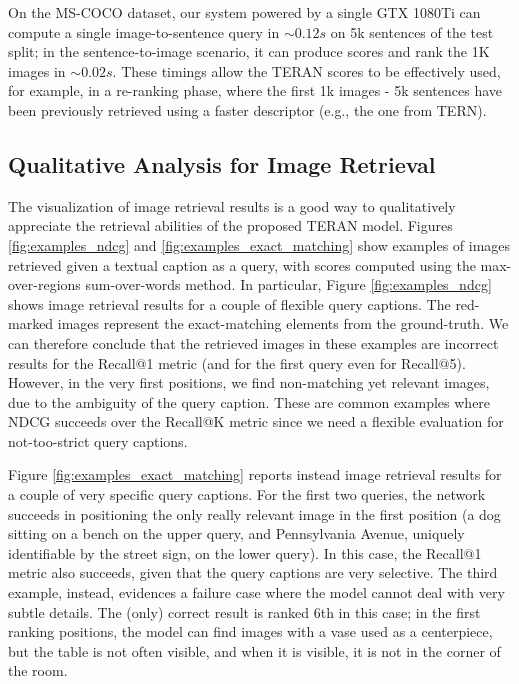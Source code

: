 \documentclass[acmsmall]{acmart}
\newif\ifdraft
\newcommand{\revised}[1]{\ifdraft{\leavevmode\color{blue}{#1}}\else{#1}\fi}
\begin{document}
\revised{On the MS-COCO dataset, our system powered by a single GTX 1080Ti can compute a single image-to-sentence query in $\sim0.12 s$ on 5k sentences of the test split; in the sentence-to-image scenario, it can produce scores and rank the 1K images in $\sim0.02 s$. These timings allow the TERAN scores to be effectively used, for example, in a re-ranking phase, where the first 1k images - 5k sentences have been previously retrieved using a faster descriptor (e.g., the one from TERN).} 



















\subsection{Qualitative Analysis for Image Retrieval}
The visualization of image retrieval results is a good way to qualitatively appreciate the retrieval abilities of the proposed TERAN model.
Figures \ref{fig:examples_ndcg} and \ref{fig:examples_exact_matching} show examples of images retrieved given a textual caption as a query, with scores computed using the max-over-regions sum-over-words method. 
In particular, Figure \ref{fig:examples_ndcg} shows image retrieval results for a couple of flexible query captions. The red-marked images represent the exact-matching elements from the ground-truth. We can therefore conclude that the retrieved images in these examples are incorrect results for the Recall@1 metric (and for the first query even for Recall@5). However, in the very first positions, we find non-matching yet relevant images, due to the ambiguity of the query caption. These are common examples where NDCG succeeds over the Recall@K metric since we need a flexible evaluation for not-too-strict query captions.

Figure \ref{fig:examples_exact_matching} reports instead image retrieval results for a couple of very specific query captions. For the first two queries, the network succeeds in positioning the only really relevant image in the first position (a dog sitting on a bench on the upper query, and Pennsylvania Avenue, uniquely identifiable by the street sign, on the lower query). In this case, the Recall@1 metric also succeeds, given that the query captions are very selective. \revised{The third example, instead, evidences a failure case where the model cannot deal with very subtle details. The (only) correct result is ranked 6th in this case; in the first ranking positions, the model can find images with a vase used as a centerpiece, but the table is not often visible, and when it is visible, it is not in the corner of the room.}
\end{document}
